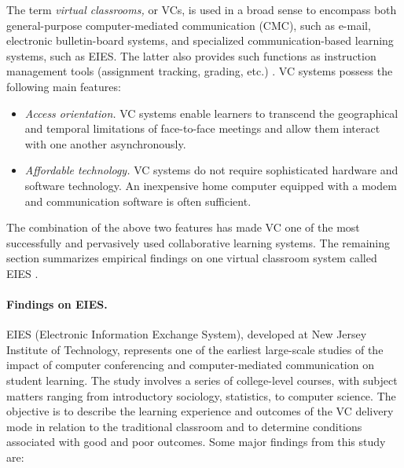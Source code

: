 The term {\it virtual classrooms,\/} or VCs, is used in a broad sense to
encompass both general-purpose computer-mediated communication (CMC), such
as e-mail, electronic bulletin-board systems, and specialized
communication-based learning systems, such as EIES.  The latter also
provides such functions as instruction management tools (assignment
tracking, grading, etc.) \cite{Hiltz88}. VC systems possess the following
main features:

 \begin{itemize}
 \item {\it Access orientation.\/} VC systems enable learners to
   transcend the geographical and temporal limitations of face-to-face
   meetings and allow them interact with one another asynchronously.
   
 \item {\it Affordable technology.\/} VC systems do not require
   sophisticated hardware and software technology. An inexpensive home
   computer equipped with a modem and communication software is often 
   sufficient. 
\end{itemize}

The combination of the above two features has made VC one of the
most successfully and pervasively used collaborative learning systems. The
remaining section summarizes empirical findings on one virtual classroom
system called EIES \cite{Hiltz88}.


\paragraph{Findings on EIES.}

EIES (Electronic Information Exchange System), developed at New Jersey
Institute of Technology, represents one of the earliest large-scale
studies of the impact of computer conferencing and computer-mediated
communication on student learning. The study involves a series of
college-level courses, with subject matters ranging from introductory
sociology, statistics, to computer science. The objective is to describe
the learning experience and outcomes of the VC delivery mode in relation to
the traditional classroom and to determine conditions associated with good
and poor outcomes. Some major findings from this study are:

